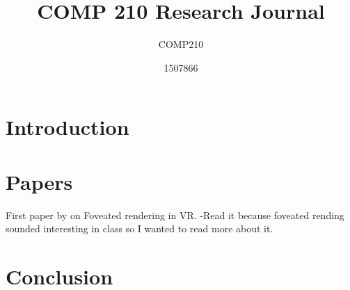 \documentclass{scrartcl}
\title{COMP 210 Research Journal}
\subtitle{COMP210}
\author{1507866}
\begin{document}
	
\maketitle
	
\abstract{}
	
\section{Introduction}

\section{Papers}
First paper by \cite{Patney} on Foveated rendering in VR. 
-Read it because foveated rending sounded interesting in class so I wanted to read more about it.


\section{Conclusion}

	


	
\end{document}
